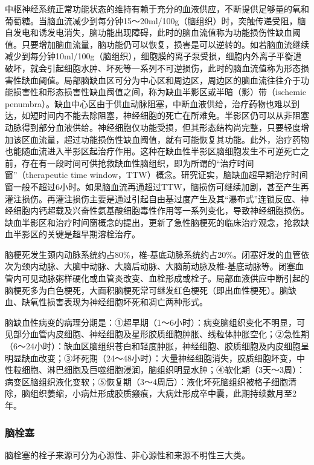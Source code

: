 中枢神经系统正常功能状态的维持有赖于充分的血液供应，不断提供足够量的氧和葡萄糖。当脑血流减少到每分钟15～20ml/100g（脑组织）时，突触传递受阻，脑自发电和诱发电消失，脑功能出现障碍，此时的脑血流值称为功能损伤性缺血阈值。只要增加脑血流量，脑功能仍可以恢复，损害是可以逆转的。如若脑血流继续减少到每分钟10ml/100g（脑组织），细胞膜的离子泵受损，细胞内外离子平衡遭破坏，就会引起细胞水肿、坏死等一系列不可逆损伤，此时的脑血流值称为形态损害性缺血阈值。局部脑缺血区可分为中心区和周边区，周边区的脑血流往往介于功能损害性和形态损害性缺血阈值之间，称为缺血半影区或半暗（影）带（ischemic
penumbra）。缺血中心区由于供血动脉阻塞，中断血液供给，治疗药物也难以到达，如短时间内不能去除阻塞，神经细胞的死亡在所难免。半影区仍可以从非阻塞动脉得到部分血液供给。神经细胞仅功能受损，但其形态结构尚完整，只要轻度增加该区血流量，超过功能损伤性缺血阈值，就有可能恢复其功能。此外，治疗药物也能随血流进入半影区起治疗作用。这种在缺血性半影区脑细胞发生不可逆死亡之前，存在有一段时间可供抢救缺血性脑组织，即为所谓的“治疗时间窗”（therapeutic
time
window，TTW）概念。研究证实，脑缺血超早期治疗时间窗一般不超过6小时。如果脑血流再通超过TTW，脑损伤可继续加剧，甚至产生再灌注损伤。再灌注损伤主要是通过引起自由基过度产生及其“瀑布式”连锁反应、神经细胞内钙超载及兴奋性氨基酸细胞毒性作用等一系列变化，导致神经细胞损伤。缺血半影区和治疗时间窗概念的提出，更新了急性脑梗死的临床治疗观念，抢救缺血半影区的关键是超早期溶栓治疗。

脑梗死发生颈内动脉系统约占80\%，椎-基底动脉系统约占20\%。闭塞好发的血管依次为颈内动脉、大脑中动脉、大脑后动脉、大脑前动脉及椎-基底动脉等。闭塞血管内可见动脉粥样硬化或血管炎改变、血栓形成或栓子。局部血液供应中断引起的脑梗死多为白色梗死，大面积脑梗死常可继发红色梗死（即出血性梗死）。脑缺血、缺氧性损害表现为神经细胞坏死和凋亡两种形式。

脑缺血性病变的病理分期是：①超早期（1～6小时）：病变脑组织变化不明显，可见部分血管内皮细胞、神经细胞及星形胶质细胞肿胀、线粒体肿胀空化；②急性期（6～24小时）：缺血区脑组织苍白和轻度肿胀，神经细胞、胶质细胞及内皮细胞呈明显缺血改变；③坏死期（24～48小时）：大量神经细胞消失，胶质细胞坏变，中性粒细胞、淋巴细胞及巨噬细胞浸润，脑组织明显水肿；④软化期（3天～3周）：病变区脑组织液化变软；⑤恢复期（3～4周后）：液化坏死脑组织被格子细胞清除，脑组织萎缩，小病灶形成胶质瘢痕，大病灶形成卒中囊，此期持续数月至2年。

\subsubsection{脑栓塞}

脑栓塞的栓子来源可分为心源性、非心源性和来源不明性三大类。

